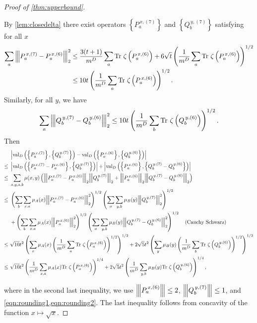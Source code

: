 \documentclass[11pt]{article}
\theoremstyle{plain}
\theoremstyle{definition}
\newcommand {\set} [1] {\ensuremath{ \left\lbrace #1 \right\rbrace }}
\newcommand {\br} [1] {\ensuremath{ \left( #1 \right) }}
\newcommand {\ab} [1] {\ensuremath{ \left| #1 \right| }}
\newcommand{\nnorm}[1]{{\left\vert\kern-0.25ex\left\vert\kern-0.25ex\left\vert #1
		\right\vert\kern-0.25ex\right\vert\kern-0.25ex\right\vert}}
\newcommand {\Tr} {\ensuremath{ \mathrm{Tr} }}
\newcommand{\gval}[3]{\ensuremath{\mathrm{val}_{#1}\br{\set{#2},\set{#3}}}}
\newcommand{\Pnn}[1] {\ensuremath{{P^{\,x, (#1)}_a}}}
\newcommand{\Qnn}[1] {\ensuremath{{Q^{\,y, (#1)}_b}}}
\newcommand{\1}{\mathbb{1}} %
\begin{document}
\begin{proof}[Proof of \cref{thm:upperbound}]
\begin{itemize}
By \cref{lem:closedelta} there exist operators $\set{\Pnn{7}}$ and $\set{\Qnn{7}}$ satisfying for all $x$
\begin{align}
\sum_a \nnorm{\Pnn{7}-\Pnn{6}}_2^2&\le\frac{3(t+1)}{m^D}\sum_{a}\Tr~\zeta\br{\Pnn{6}}+6\sqrt{t}\br{\frac{1}{m^D}\sum_{a}\Tr~\zeta\br{\Pnn{6}}}^{1/2} \nonumber\\
&\le10t\br{\frac{1}{m^D}\sum_{a}\Tr~\zeta\br{\Pnn{6}}}^{1/2}\label{eqn:rounding1}.
\end{align}
Similarly, for all $y$, we have
\begin{equation}\label{eqn:rounding2}
\sum_a \nnorm{\Qnn{7}-\Qnn{6}}_2^2\le10t\br{\frac{1}{m^D}\sum_{b}\Tr~\zeta\br{\Qnn{6}}}^{1/2}.
\end{equation}
Then
\begin{align*}
&\ab{\gval{D}{\Pnn{7}}{\Qnn{7}}-\gval{D}{\Pnn{6}}{\Qnn{6}}}\\
\leq~&\ab{\gval{D}{\Pnn{7}-\Pnn{6}}{\Qnn{7}}}+\ab{\gval{D}{\Pnn{6}}{\Qnn{7}-\Qnn{6}}}\\
\leq~&\sum_{x,y,a,b}\mu(x,y)\br{\nnorm{\Pnn{7}-\Pnn{6}}_2\nnorm{\Qnn{7}}_2+\nnorm{\Pnn{6}}_2\nnorm{\Qnn{7}-\Qnn{6}}_2}\\
\leq~&\br{\sum_b\sum_{x,a}\mu_A(x)\nnorm{\Pnn{7}-\Pnn{6}}_2^2}^{1/2}\br{\sum_a\sum_{y,b}\mu_B(y)\nnorm{\Qnn{7}}_2^2}^{1/2}\\
&+\br{\sum_b\sum_{x,a}\mu_A(x)\nnorm{\Pnn{6}}_2^2}^{1/2}\br{\sum_a\sum_{y,b}\mu_B(y)\nnorm{\Qnn{7}-\Qnn{6}}_2^2}^{1/2}\quad\mbox{(Cauchy Schwarz)}\\
\leq~&\sqrt{10}t^2\br{\sum_{x}\mu_A(x)\br{\frac{1}{m^{D}}\sum_{a}\Tr~\zeta\br{\Pnn{6}}}^{1/2}}^{1/2}+2\sqrt{5}t^2\br{\sum_{y}\mu_B(y)\br{\frac{1}{m^{D}}\sum_{b}\Tr~\zeta\br{\Qnn{6}}}^{1/2}}^{1/2}\\
\leq~&\sqrt{10}t^2\br{\frac{1}{m^{D}}\sum_{x, a}\mu_A(x)\Tr~\zeta\br{\Pnn{6}}}^{1/4}+2\sqrt{5}t^2\br{\frac{1}{m^{D}}\sum_{y, b}\mu_B(y)\Tr~\zeta\br{\Qnn{6}}}^{1/4},
\end{align*}
\end{itemize}
where in the second last inequality, we use $\nnorm{\Pnn{6}} \leq 2$, $\nnorm{\Qnn{7}} \leq 1$, and \cref{eqn:rounding1,eqn:rounding2}.
The last inequality follows from concavity of the function $x\mapsto \sqrt{x}$.


\end{proof}
\end{document}
